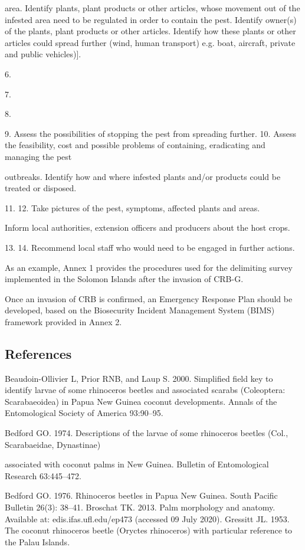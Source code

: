 \documentclass[twocolumn,letterpaper]{scrartcl}
\begin{document}
area.
Identify plants, plant products or other articles, whose movement out of the infested area need to be 
regulated in order to contain the pest.
Identify owner(s) of the plants, plant products or other articles. 
Identify  how  these  plants  or  other  articles  could  spread  further  (wind,  human  transport)  e.g.  boat, 
aircraft, private and public vehicles)].

6. 

7. 

8. 

9.  Assess the possibilities of stopping the pest from spreading further.
10.  Assess the feasibility, cost and possible problems of containing, eradicating and managing the pest 

outbreaks.
Identify how and where infested plants and/or products could be treated or disposed.

11. 
12.  Take pictures of the pest, symptoms, affected plants and areas.

Inform local authorities, extension officers and producers about the host crops. 

13. 
14.  Recommend local staff who would need to be engaged in further actions.

As an example, Annex 1 provides the procedures used for the delimiting survey implemented in the Solomon 
Islands after the invasion of CRB-G. 

Once  an  invasion  of  CRB  is  confirmed,  an  Emergency  Response  Plan  should  be  developed,  based  on  the 
Biosecurity Incident Management System (BIMS) framework provided in Annex 2. 

\subsection{References}
 
Beaudoin-Ollivier  L,  Prior  RNB,  and  Laup  S.  2000.  Simplified  field  key  to  identify  larvae  of  some  rhinoceros 
beetles and associated scarabs (Coleoptera: Scarabaeoidea) in Papua New Guinea coconut developments. 
Annals of the Entomological Society of America 93:90–95.

Bedford  GO.  1974.  Descriptions  of  the  larvae  of  some  rhinoceros  beetles  (Col.,  Scarabaeidae,  Dynastinae) 

associated with coconut palms in New Guinea. Bulletin of Entomological Research 63:445–472.

Bedford GO. 1976. Rhinoceros beetles in Papua New Guinea. South Pacific Bulletin 26(3): 38–41.
Broschat TK. 2013. Palm morphology and anatomy. Available at: edis.ifas.ufl.edu/ep473 (accessed 09 July 2020).
Gressitt JL. 1953. The coconut rhinoceros beetle (Oryctes rhinoceros) with particular reference to the Palau Islands. 
\end{document}
